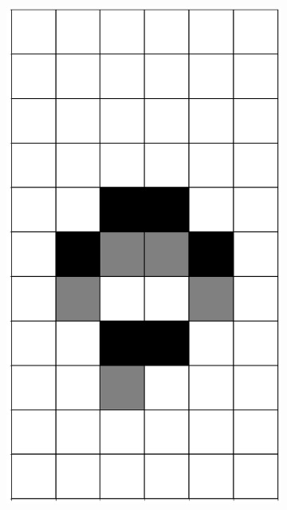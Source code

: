 \documentclass[12pt]{article}
\numberwithin{figure}{section} %
\begin{document}
\begin{figure}[H]
\begin{subfigure}{0.19\textwidth}
     		\centering
     		\includegraphics[width=\linewidth]{Section4/2.1}
   	\end{subfigure}
        \begin{subfigure}{0.19\textwidth}
     		\centering

\end{subfigure}
\end{figure}
\end{document}
